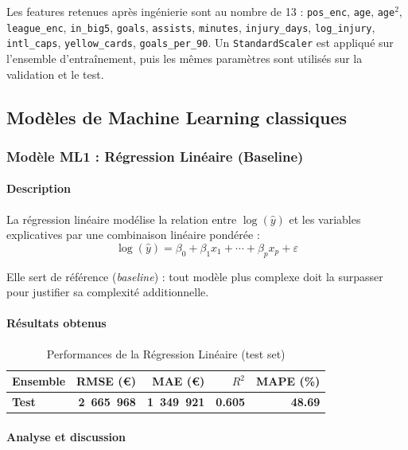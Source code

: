 \documentclass[12pt,a4paper]{article}
\begin{document}
Les features retenues après ingénierie sont au nombre de 13 :
\texttt{pos\_enc}, \texttt{age}, \texttt{age}$^2$, \texttt{league\_enc},
\texttt{in\_big5}, \texttt{goals}, \texttt{assists}, \texttt{minutes},
\texttt{injury\_days}, \texttt{log\_injury}, \texttt{intl\_caps},
\texttt{yellow\_cards}, \texttt{goals\_per\_90}.
Un \texttt{StandardScaler} est appliqué sur l'ensemble d'entraînement, puis
les mêmes paramètres sont utilisés sur la validation et le test.


\subsection{Modèles de Machine Learning classiques}

\subsubsection{Modèle ML1 : Régression Linéaire (Baseline)}

\paragraph{Description}

La régression linéaire modélise la relation entre $\log(\hat{y})$ et les
variables explicatives par une combinaison linéaire pondérée :
\[
\log(\hat{y}) = \beta_0 + \beta_1 x_1 + \cdots + \beta_p x_p + \varepsilon
\]

Elle sert de référence (\textit{baseline}) : tout modèle plus complexe doit la
surpasser pour justifier sa complexité additionnelle.

\paragraph{Résultats obtenus}

\begin{table}[H]
\centering
\begin{tabular}{@{}lrrrr@{}}
\toprule
\textbf{Ensemble} & \textbf{RMSE (€)} & \textbf{MAE (€)} & \textbf{$R^2$} & \textbf{MAPE (\%)} \\ \midrule
\textbf{Test} & \textbf{2~665~968} & \textbf{1~349~921} & \textbf{0.605} & \textbf{48.69} \\ \bottomrule
\end{tabular}
\caption{Performances de la Régression Linéaire (test set)}
\end{table}

\paragraph{Analyse et discussion}
\end{document}
